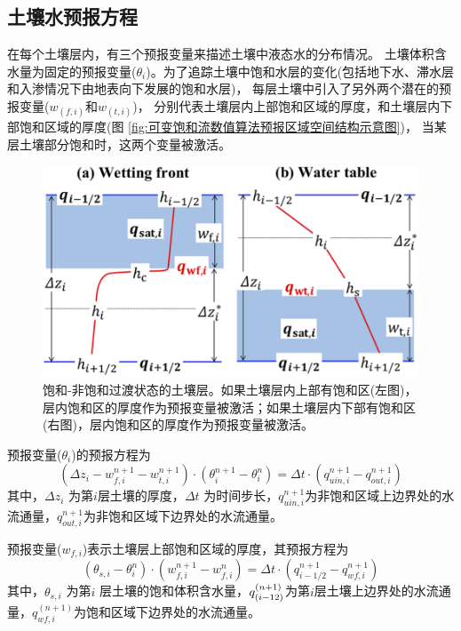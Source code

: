 \subsection{土壤水预报方程}
在每个土壤层内，有三个预报变量来描述土壤中液态水的分布情况。
土壤体积含水量为固定的预报变量($θ_i$)。为了追踪土壤中饱和水层的变化(包括地下水、滞水层和入渗情况下由地表向下发展的饱和水层)，
每层土壤中引入了另外两个潜在的预报变量($w_(f,i)$和$w_(t,i)$)，
分别代表土壤层内上部饱和区域的厚度，和土壤层内下部饱和区域的厚度(图 \ref{fig:可变饱和流数值算法预报区域空间结构示意图})，
当某层土壤部分饱和时，这两个变量被激活。
{
\begin{figure}[]
\centering
\includegraphics{Figures/陆地表面的水分循环/饱和-非饱和过渡状态的土壤层.png}
\caption{饱和-非饱和过渡状态的土壤层。如果土壤层内上部有饱和区(左图)，
层内饱和区的厚度作为预报变量被激活；如果土壤层内下部有饱和区(右图)，层内饱和区的厚度作为预报变量被激活。}
\label{fig:饱和-非饱和过渡状态的土壤层}
\end{figure}
}


预报变量($\theta_i$)的预报方程为
\begin{equation}\label{si_in1}
\left(\Delta z_{i}-w_{f, i}^{n+1}-w_{t, i}^{n+1}\right) \cdot\left(\theta_{i}^{n+1}-\theta_{i}^{n}\right)=\Delta t \cdot\left(q_{ {uin,i }}^{n+1}-q_{ {out }, i}^{n+1}\right)
\end{equation}
其中，$\Delta z_i$ 为第$ i $层土壤的厚度，$\Delta t$ 为时间步长，$q_{uin,i}^{n+1}$为非饱和区域上边界处的水流通量，$q_{out,i}^{n+1}$为非饱和区域下边界处的水流通量。


预报变量($w_{f,i}$)表示土壤层上部饱和区域的厚度，其预报方程为
\begin{equation}\label{si_in2}
\left(\theta_{s, i}-\theta_{i}^{n}\right) \cdot\left(w_{f, i}^{n+1}-w_{f, i}^{n}\right)=\Delta t \cdot\left(q_{i-1 / 2}^{n+1}-q_{w f, i}^{n+1}\right)
\end{equation}
其中，$\theta_{s,i}$ 为第$ i$ 层土壤的饱和体积含水量，$ q_{(i-1\/2)}^{(n+1)}$为第$ i $层土壤上边界处的水流通量，$q_{wf,i}^{(n+1)}$为饱和区域下边界处的水流通量。


